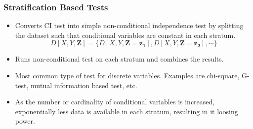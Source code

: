 \documentclass{beamer}
\begin{document}
\begin{frame}
	\frametitle{Stratification Based Tests}
	\begin{itemize}
		\setlength\itemsep{1em}
		\item Converts CI test into simple non-conditional independence test by splitting 
			the dataset such that conditional variables are constant in each stratum. \newline
			$$ D[X, Y, \bm{Z}] = \{ D[X, Y, \bm{Z}=\bm{z_1}], D[X, Y, \bm{Z}=\bm{z_2}], \cdots \} $$
		\item Runs non-conditional test on each stratum and combines the results.
		\item Most common type of test for discrete variables. Examples
			are chi-square, G-test, mutual information based test,
			etc. 
		\item As the number or cardinality of conditional variables is
			increased, exponentially less data is available in each
			stratum, resulting in it loosing power.
	\end{itemize}
\end{frame}
\end{document}
